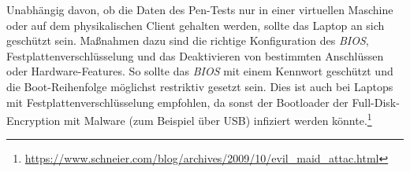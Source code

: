 		Unabhängig davon, ob die Daten des Pen-Tests nur in einer virtuellen Maschine oder auf dem physikalischen Client gehalten werden, sollte das Laptop an sich geschützt sein. Maßnahmen dazu sind die richtige Konfiguration des \textit{BIOS}, Festplattenverschlüsselung und das Deaktivieren von bestimmten Anschlüssen oder Hardware-Features. So sollte das \textit{BIOS} mit einem Kennwort geschützt und die Boot-Reihenfolge möglichst restriktiv gesetzt sein. Dies ist auch bei Laptops mit Festplattenverschlüsselung empfohlen, da sonst der Bootloader der Full-Disk-Encryption mit Malware (zum Beispiel über USB) infiziert werden könnte.\footnote{\url{https://www.schneier.com/blog/archives/2009/10/evil_maid_attac.html}}
